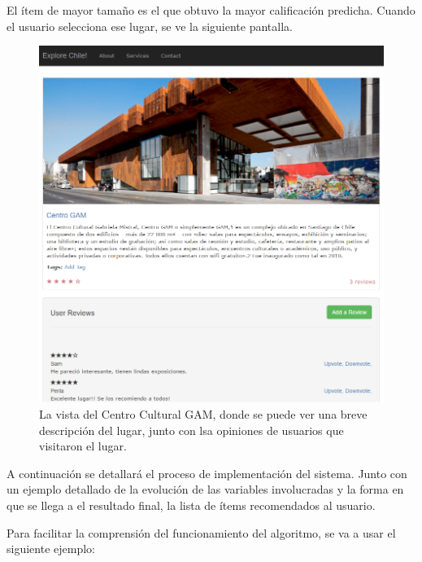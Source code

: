 El ítem de mayor tamaño es el que obtuvo la mayor calificación predicha. Cuando el usuario selecciona ese lugar, se ve la siguiente pantalla.

\begin{figure}[hbtp]
\centering
\includegraphics[scale=0.7]{images/screen1.png}
\caption{La vista del Centro Cultural GAM, donde se puede ver una breve descripción del lugar, junto con lsa opiniones de usuarios que visitaron el lugar.}
\end{figure}  

A continuación se detallará el proceso de implementación del sistema. Junto con un ejemplo detallado de la evolución de las variables involucradas y la forma en que se llega a el resultado final, la lista de ítems recomendados al usuario.

Para facilitar la comprensión del funcionamiento del algoritmo, se va a usar el siguiente ejemplo:

